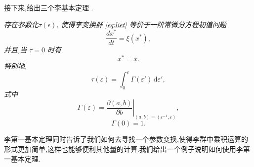 接下来,给出三个李基本定理 \cite{bluman2008symmetry}.
\begin{theorem}[李第一基本定理]
\emph{存在参数化$\tau(\epsilon)$, 使得李变换群 \eqref{eq:liet} 等价于一阶常微分方程初值问题
\begin{equation*}
\frac{dx^*}{dt}=\xi(x^*),
\end{equation*}
并且,当 $\tau=0$ 时有
\begin{equation*}
x^*=x.
\end{equation*}
特别地,
\begin{equation*}
\tau(\varepsilon)=\int_0^{\varepsilon}\Gamma(\varepsilon ')\,\mathrm{d}\varepsilon ',
\end{equation*}
式中
\begin{equation*}
\Gamma(\varepsilon)=\left.\frac{\partial(a,b)}{\partial b}\right|_{(a,b)=(\varepsilon^{-1},\varepsilon)},
\end{equation*}
\begin{equation*}
\Gamma(0)=1.
\end{equation*}}
\end{theorem}

李第一基本定理同时告诉了我们如何去寻找一个参数变换,使得李群中乘积运算的形式更加简单,这样也能够便利其他量的计算.我们给出一个例子说明如何使用李第一基本定理.

